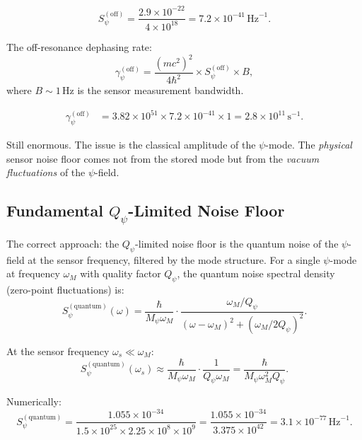 \documentclass[11pt]{article}
\theoremstyle{definition}
\theoremstyle{remark}
\newcommand{\Qpsi}{Q_\psi}
\newcommand{\Mpsi}{M_\psi}
\begin{document}
\begin{equation}
S_\psi^{(\mathrm{off})} = \frac{2.9 \times 10^{-22}}{4 \times 10^{18}}
= 7.2 \times 10^{-41}\,\mathrm{Hz}^{-1}.
\end{equation}

The off-resonance dephasing rate:
\begin{equation}
\gamma_{\psi}^{(\mathrm{off})} = \frac{(mc^2)^2}{4\hbar^2}
\times S_\psi^{(\mathrm{off})} \times B,
\end{equation}
where $B \sim 1$\,Hz is the sensor measurement bandwidth.

\begin{align}
\gamma_{\psi}^{(\mathrm{off})} &= 3.82 \times 10^{51}
\times 7.2 \times 10^{-41} \times 1
= 2.8 \times 10^{11}\,\mathrm{s}^{-1}.
\end{align}

Still enormous. The issue is the classical amplitude of the $\psi$-mode.
The \emph{physical} sensor noise floor comes not from the stored mode
but from the \emph{vacuum fluctuations} of the $\psi$-field.

\subsection{Fundamental $\Qpsi$-Limited Noise Floor}

The correct approach: the $\Qpsi$-limited noise floor is the quantum
noise of the $\psi$-field at the sensor frequency, filtered by the
mode structure. For a single $\psi$-mode at frequency $\omega_M$ with
quality factor $\Qpsi$, the quantum noise spectral density (zero-point
fluctuations) is:
\begin{equation}
S_\psi^{(\mathrm{quantum})}(\omega) = \frac{\hbar}{\Mpsi \omega_M}
\cdot \frac{\omega_M / \Qpsi}{(\omega - \omega_M)^2 + (\omega_M / 2\Qpsi)^2}.
\end{equation}

At the sensor frequency $\omega_s \ll \omega_M$:
\begin{equation}
S_\psi^{(\mathrm{quantum})}(\omega_s) \approx
\frac{\hbar}{\Mpsi \omega_M} \cdot \frac{1}{\Qpsi \omega_M}
= \frac{\hbar}{\Mpsi \omega_M^2 \Qpsi}.
\end{equation}

Numerically:
\begin{equation}
S_\psi^{(\mathrm{quantum})} = \frac{1.055 \times 10^{-34}}
{1.5 \times 10^{25} \times 2.25 \times 10^8 \times 10^9}
= \frac{1.055 \times 10^{-34}}{3.375 \times 10^{42}}
= 3.1 \times 10^{-77}\,\mathrm{Hz}^{-1}.
\end{equation}
\end{document}
